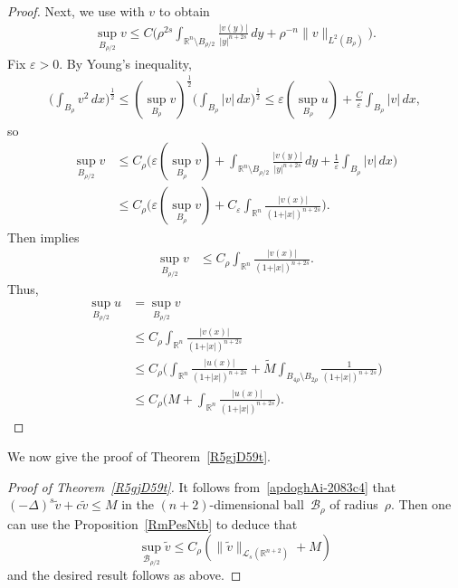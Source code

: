 \documentclass[a4paper,12pt,reqno]{amsart}
\numberwithin{equation}{section}
\theoremstyle{definition}
\theoremstyle{notation}
\newcommand{\R}{\mathds{R}}
\begin{document}
\begin{proof}
    Next, we use \cite[Theorem 1.1]{kim_holder_2023} with \(v\) to obtain \begin{align*}
        \sup_{B_{\rho /2}} v \leq C \bigg ( \rho^{2s} \int_{\R^n\setminus B_{\rho/2}} \frac{\vert v(y)\vert}{\vert y \vert^{n+2s}} \, dy + \rho^{-n} \| v\|_{L^2(B_{\rho})} \bigg ).   
    \end{align*} Fix \(\varepsilon>0\). By Young's inequality, \begin{align*}
        \bigg ( \int_{B_\rho} v^2 \, dx \bigg )^{\frac 12}  \leq (\sup_{B_\rho} v )^{\frac12} \bigg (\int_{B_\rho} \vert v\vert  \, dx \bigg )^{\frac12} \leq \varepsilon( \sup_{B_\rho} u )+ \frac C{\varepsilon} \int_{B_\rho} \vert v \vert \, dx , 
    \end{align*} so \begin{align*}
        \sup_{B_{\rho /2}} v &\leq C_\rho \bigg (  \varepsilon  ( \sup_{B_\rho} v ) +  \int_{\R^n\setminus B_{\rho/2}} \frac{\vert v(y)\vert}{\vert y \vert^{n+2s}} \, dy+ \frac 1{\varepsilon} \int_{B_\rho} \vert v \vert \, dx\bigg ) \\
        &\leq C_\rho \bigg (  \varepsilon  ( \sup_{B_\rho} v ) + C_\varepsilon \int_{\R^n} \frac{\vert v(x) \vert }{(1+\vert x \vert)^{n+2s}}  \bigg ). 
    \end{align*} Then \cite[Lemma B.1]{cabre_bernstein_2022} implies \begin{align*}
        \sup_{B_{\rho /2}} v &\leq C_\rho \int_{\R^n} \frac{\vert v(x) \vert }{(1+\vert x \vert)^{n+2s}} .
    \end{align*} Thus, \begin{align*}
         \sup_{B_{\rho /2}} u&= \sup_{B_{\rho /2}} v\\
         &\leq C_\rho \int_{\R^n} \frac{\vert v(x) \vert }{(1+\vert x \vert)^{n+2s}} \\
         &\leq C_\rho \bigg (\int_{\R^n} \frac{\vert u(x) \vert }{(1+\vert x \vert)^{n+2s}} + \tilde M \int_{B_{4\rho}\setminus B_{2\rho}} \frac1{(1+\vert x \vert)^{n+2s}} \bigg )\\
         &\leq C_\rho \bigg ( M +\int_{\R^n} \frac{\vert u(x) \vert }{(1+\vert x \vert)^{n+2s}} \bigg ) .
    \end{align*}
\end{proof}


We now give the proof of Theorem~\ref{R5gjD59t}.




\begin{proof}[Proof of Theorem~\ref{R5gjD59t}] It follows from~\eqref{apdoghAi-2083c4} that~$
(-\Delta)^s\tilde v +c\tilde v \leqslant M $ in the $(n+2)$-dimensional ball~${\mathcal{B}}_\rho$ of radius~$\rho$. Then one can use the Proposition~\ref{RmPesNtb} to deduce that
$$ \sup_{{\mathcal{B}}_{\rho/2}} \tilde v \leqslant C_\rho \left(\|\tilde v\|_{  \mathscr L_s(\R^{n+2}) }+ M \right) $$and the desired result follows as above.
\end{proof}
\end{document}
